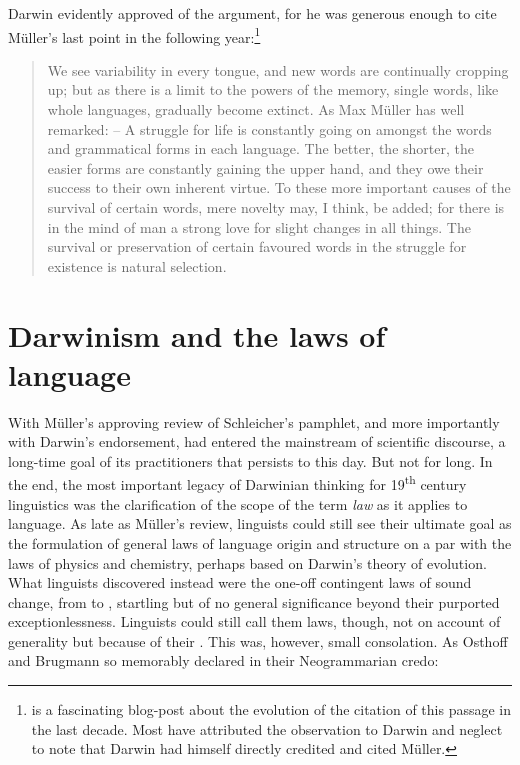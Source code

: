 \documentclass[output=paper,
modfonts
]{LSP/langsci}
\begin{document}
Darwin evidently approved of the argument, for he was generous enough to cite Müller's last point in  the following year:\footnote{\citet{Dingemanse2013} is a fascinating blog-post about the evolution of the citation of this passage in the last decade.  Most have attributed the observation to Darwin and neglect to note that Darwin had himself directly credited and cited Müller.}

\begin{quote}
We see variability in every tongue, and new words are continually cropping up; but as there is a limit to the powers of the memory, single words, like whole languages, gradually become extinct. As Max Müller has well remarked: -- {\textquotedbl}A struggle for life is constantly going on amongst the words and grammatical forms in each language. The better, the shorter, the easier forms are constantly gaining the upper hand, and they owe their success to their own inherent virtue.{\textquotedbl}{ }To these more important causes of the survival of certain words, mere novelty may, I think, be added; for there is in the mind of man a strong love for slight changes in all things. The survival or preservation of certain favoured words in the struggle for existence is natural selection. \citep[60--61]{Darwin1871}
\end{quote}

\section{Darwinism and the laws of language}

With Müller's approving review of Schleicher's pamphlet, and more importantly with Darwin's endorsement,  had entered the mainstream of scientific discourse, a long-time goal of its practitioners that persists to this day. But not for long.  In the end, the most important legacy of Darwinian thinking for 19\textsuperscript{th} century linguistics was the clarification of the scope of the term \textit{law} as it applies to language.  As late as Müller's review, linguists could still see their ultimate goal as the formulation of general laws of language origin and structure on a par with the laws of physics and chemistry, perhaps based on Darwin's theory of evolution.  What linguists discovered instead were the one-off contingent laws of sound change, from  to , startling but of no general significance beyond their purported exceptionlessness.  Linguists could still call them laws, though, not on account of generality but because of their .  This was, however, small consolation. As Osthoff and Brugmann so memorably declared in their Neogrammarian credo:
\end{document}
